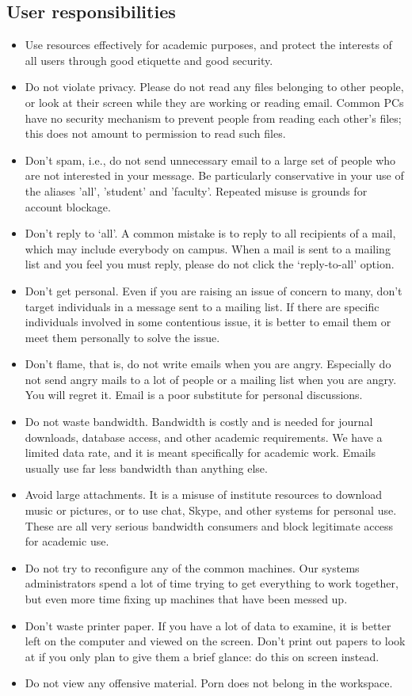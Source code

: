 \documentclass[a4paper,10pt]{article}
\begin{document}
\subsection{User responsibilities}
\begin{itemize}
    \item Use resources effectively for academic purposes, and protect the
interests of all users through good etiquette and good security.
    \item Do not violate privacy. Please do not read any files belonging to other people, or look at
their screen while they are working or reading email. Common PCs have no security
mechanism to prevent people from reading each other's files; this does not amount to
permission to read such files.
    \item Don't spam, i.e., do not send unnecessary email to a large set of people who are not
interested in your message. Be particularly conservative in your use of the aliases 'all',
'student' and 'faculty'. Repeated misuse is grounds for account blockage.
    \item Don’t reply to ‘all’. A common mistake is to reply to all recipients of a mail, which may
include everybody on campus. When a mail is sent to a mailing list and you feel you must
reply, please do not click the ‘reply-to-all’ option.
    \item Don’t get personal. Even if you are raising an issue of concern to many, don't target
individuals in a message sent to a mailing list. If there are specific individuals involved in
some contentious issue, it is better to email them or meet them personally to solve the issue.
    \item Don't flame, that is, do not write emails when you are angry. Especially do not send angry
mails to a lot of people or a mailing list when you are angry. You will regret it. Email is a
poor substitute for personal discussions.
    \item Do not waste bandwidth. Bandwidth is costly and is needed for journal downloads, database
access, and other academic requirements. We have a limited data rate, and it is meant
specifically for academic work. Emails usually use far less bandwidth than anything else.
    \item Avoid large attachments. It is a misuse of institute resources to download music or pictures,
or to use chat, Skype, and other systems for personal use. These are all very serious
bandwidth consumers and block legitimate access for academic use.
    \item Do not try to reconfigure any of the common machines. Our systems administrators spend a
lot of time trying to get everything to work together, but even more time fixing up machines
that have been messed up.
    \item Don't waste printer paper. If you have a lot of data to examine, it is better left on the
computer and viewed on the screen. Don’t print out papers to look at if you only plan to give
them a brief glance: do this on screen instead.
    \item Do not view any offensive material. Porn does not belong in the workspace.
\end{itemize}
\end{document}
